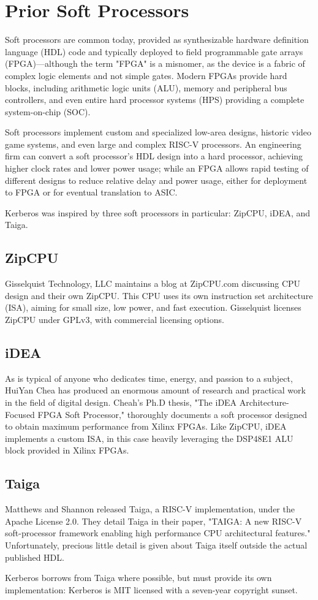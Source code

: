 \chapter{Prior Soft Processors}

Soft processors are common today, provided as synthesizable hardware definition language (HDL) code and typically deployed to field programmable gate arrays (FPGA)—although the term "FPGA" is a misnomer, as the device is a fabric of complex logic elements and not simple gates.  Modern FPGAs provide hard blocks, including arithmetic logic units (ALU), memory and peripheral bus controllers, and even entire hard processor systems (HPS) providing a complete system-on-chip (SOC).

Soft processors implement custom and specialized low-area designs, historic video game systems, and even large and complex RISC-V processors.  An engineering firm can convert a soft processor's HDL design into a hard processor, achieving higher clock rates and lower power usage; while an FPGA allows rapid testing of different designs to reduce relative delay and power usage, either for deployment to FPGA or for eventual translation to ASIC.

Kerberos was inspired by three soft processors in particular:  ZipCPU, iDEA, and Taiga.

\section{ZipCPU}
Gisselquist Technology, LLC maintains a blog at ZipCPU.com discussing CPU design and their own ZipCPU.  This CPU uses its own instruction set architecture (ISA), aiming for small size, low power, and fast execution.  Gisselquist licenses ZipCPU under GPLv3, with commercial licensing options.

\section{iDEA}
As is typical of anyone who dedicates time, energy, and passion to a subject, HuiYan Chea has produced an enormous amount of research and practical work in the field of digital design.  Cheah's Ph.D thesis, "The iDEA Architecture-Focused FPGA Soft Processor," thoroughly documents a soft processor designed to obtain maximum performance from Xilinx FPGAs.  Like ZipCPU, iDEA implements a custom ISA, in this case heavily leveraging the DSP48E1 ALU block provided in Xilinx FPGAs.

\section{Taiga}

Matthews and Shannon released Taiga, a RISC-V implementation, under the Apache License 2.0.  They detail Taiga in their paper, "TAIGA: A new RISC-V soft-processor framework enabling high performance CPU architectural features."  Unfortunately, precious little detail is given about Taiga itself outside the actual published HDL.

Kerberos borrows from Taiga where possible, but must provide its own implementation:  Kerberos is MIT licensed with a seven-year copyright sunset.
